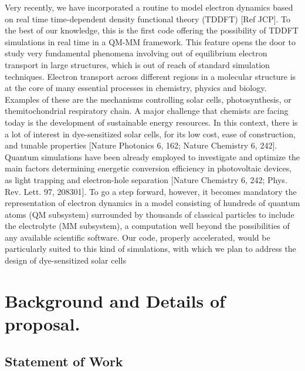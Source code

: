 \documentclass[a4paper,10pt]{article}
\begin{document}
Very recently, we have incorporated a routine to model electron dynamics based on real time time-dependent density functional theory (TDDFT) [Ref JCP]. 
To the best of our knowledge, this is the first code offering the possibility of TDDFT simulations in real time in a QM-MM framework. 
This feature opens the door to study very fundamental phenomena involving out of equilibrium electron transport in large structures, which is out of reach of
standard simulation techniques. 
Electron transport across different regions in a molecular structure is at the core of many essential processes in chemistry, physics and biology.
Examples of these are the mechanisms controlling solar cells, photosynthesis, or themitochondrial respiratory chain. 
A major challenge that chemists are facing today is the development of sustainable energy resources. 
In this context, there is a lot of interest in dye-sensitized solar cells, for its low cost, ease of construction, and tunable properties [Nature Photonics 6, 162; Nature Chemistry 6, 242]. 
Quantum simulations have been already employed to investigate and optimize the main factors determining energetic conversion efficiency in photovoltaic devices, as light trapping and electron-hole separation [Nature Chemistry 6, 242; Phys. Rev. Lett. 97, 208301]. 
To go a step forward, however, it becomes mandatory the representation of electron dynamics in a model consisting of hundreds of quantum atoms (QM subsystem) surrounded by thousands of
classical particles to include the electrolyte (MM subsystem), a computation well beyond the possibilities of any available scientific software. 
Our code, properly accelerated, would be particularly suited to this kind of simulations, with which we plan to address the design of dye-sensitized solar cells 

\newpage

\section{Background and Details of proposal.}

\subsection{Statement of Work}
\end{document}
